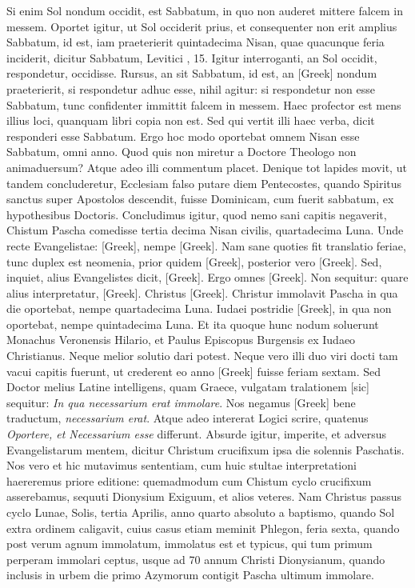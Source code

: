 Si enim Sol nondum occidit, est Sabbatum,
in quo non auderet mittere falcem in messem.
Oportet igitur,
ut Sol occiderit prius, et consequenter non erit amplius Sabbatum,
id est, iam praeterierit quintadecima Nisan, quae quacunque feria
inciderit, dicitur Sabbatum, Levitici , 15.
Igitur interroganti,
an Sol occidit, respondetur, occidisse.
Rursus, an sit Sabbatum, id
est, an \textgreek{[Greek]} nondum praeterierit, si respondetur adhuc
esse, nihil agitur: si respondetur non esse Sabbatum, tunc confidenter
immittit falcem in messem.
Haec profector est mens illius loci,
quanquam libri copia non est.
Sed qui vertit illi haec verba, dicit responderi
esse Sabbatum.
Ergo hoc modo oportebat omnem 
Nisan esse Sabbatum, omni anno.
Quod quis non miretur a Doctore
Theologo non animaduersum?
Atque adeo illi commentum
placet.
Denique tot lapides movit, ut tandem concluderetur, Ecclesiam
falso putare diem Pentecostes, quando Spiritus sanctus super
Apostolos descendit, fuisse Dominicam, cum fuerit sabbatum, ex
hypothesibus Doctoris.
Concludimus igitur, quod nemo sani capitis
negaverit, Chistum Pascha comedisse tertia decima Nisan civilis,
quartadecima Luna.
Unde recte Evangelistae: \textgreek{[Greek]},
nempe \textgreek{[Greek]}.
Nam sane quoties fit translatio feriae,
tunc duplex est neomenia, prior quidem \textgreek{[Greek]}, posterior vero
\textgreek{[Greek]}.
Sed, inquiet, alius Evangelistes dicit, \textgreek{[Greek]}.
Ergo omnes \textgreek{[Greek]}.
Non sequitur: quare alius interpretatur, \textgreek{[Greek]}.
Christus \textgreek{[Greek]}.
Christur immolavit Pascha in qua die
oportebat, nempe quartadecima Luna.
Iudaei postridie \textgreek{[Greek]},
in qua non oportebat, nempe quintadecima Luna.
Et ita quoque
hunc nodum soluerunt Monachus Veronensis Hilario, et Paulus
Episcopus Burgensis ex Iudaeo Christianus.
Neque melior solutio
dari potest.
Neque vero illi duo viri docti tam vacui capitis fuerunt,
ut crederent eo anno \textgreek{[Greek]} fuisse feriam sextam.
Sed Doctor melius Latine intelligens, quam Graece,
 vulgatam tralationem [sic]
sequitur: \textit{In qua necessarium erat immolare}.
Nos negamus
\textgreek{[Greek]} bene traductum, \textit{necessarium erat}.
Atque adeo intererat Logici
scrire, quatenus \textit{Oportere, et Necessarium esse} differunt.
Absurde igitur, imperite, et adversus Evangelistarum mentem, dicitur
Christum crucifixum ipsa die solennis Paschatis.
Nos vero et
hic mutavimus sententiam, cum huic stultae interpretationi haereremus
priore editione: quemadmodum cum Chistum cyclo  crucifixum
asserebamus, sequuti Dionysium Exiguum, et alios veteres.
Nam Christus passus cyclo  Lunae,  Solis,
 tertia Aprilis,
anno quarto absoluto a baptismo, quando Sol extra ordinem caligavit,
cuius casus etiam meminit Phlegon, feria sexta, quando
post verum agnum immolatum, immolatus est et typicus, qui tum
primum perperam immolari ceptus, usque ad 70 annum Christi
Dionysianum, quando inclusis in urbem die primo Azymorum
contigit Pascha ultimum immolare.

